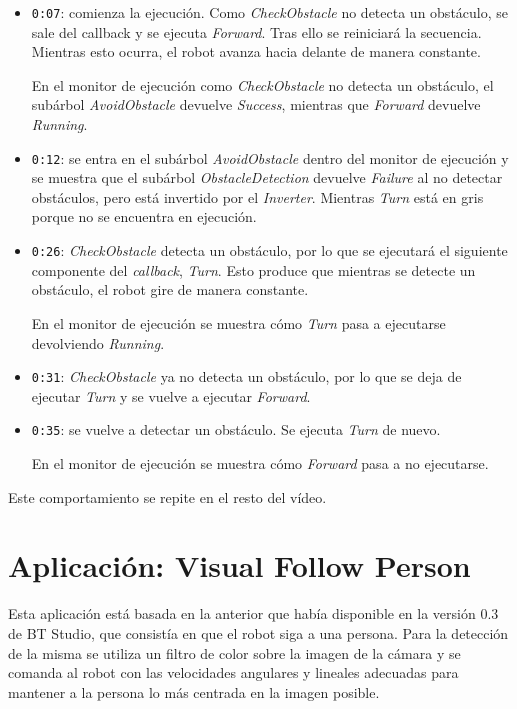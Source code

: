 \begin{itemize}
    \item \texttt{0:07}: comienza la ejecución. Como \textit{CheckObstacle} no detecta un obstáculo, se sale del callback y se ejecuta \textit{Forward}. Tras ello se reiniciará la secuencia. Mientras esto ocurra, el robot avanza hacia delante de manera constante.
    
    En el monitor de ejecución como \textit{CheckObstacle} no detecta un obstáculo, el subárbol \textit{AvoidObstacle} devuelve \textit{Success}, mientras que \textit{Forward} devuelve \textit{Running}.
    \item \texttt{0:12}: se entra en el subárbol \textit{AvoidObstacle} dentro del monitor de ejecución y se muestra que el subárbol \textit{ObstacleDetection} devuelve \textit{Failure} al no detectar obstáculos, pero está invertido por el \textit{Inverter}. Mientras \textit{Turn} está en gris porque no se encuentra en ejecución.
    \item \texttt{0:26}: \textit{CheckObstacle} detecta un obstáculo, por lo que se ejecutará el siguiente componente del \textit{callback}, \textit{Turn}. Esto produce que mientras se detecte un obstáculo, el robot gire de manera constante.

    En el monitor de ejecución se muestra cómo \textit{Turn} pasa a ejecutarse devolviendo \textit{Running}.
    \item \texttt{0:31}: \textit{CheckObstacle} ya no detecta un obstáculo, por lo que se deja de ejecutar \textit{Turn} y se vuelve a ejecutar \textit{Forward}.
    \item \texttt{0:35}: se vuelve a detectar un obstáculo. Se ejecuta \textit{Turn} de nuevo.

    En el monitor de ejecución se muestra cómo \textit{Forward} pasa a no ejecutarse. 
\end{itemize}

Este comportamiento se repite en el resto del vídeo. 

\section{Aplicación: Visual Follow Person}

Esta aplicación está basada en la anterior que había disponible en la versión 0.3 de BT Studio, que consistía en que el robot siga a una persona. Para la detección de la misma se utiliza un filtro de color sobre la imagen de la cámara y se comanda al robot con las velocidades angulares y lineales adecuadas para mantener a la persona lo más centrada en la imagen posible.

